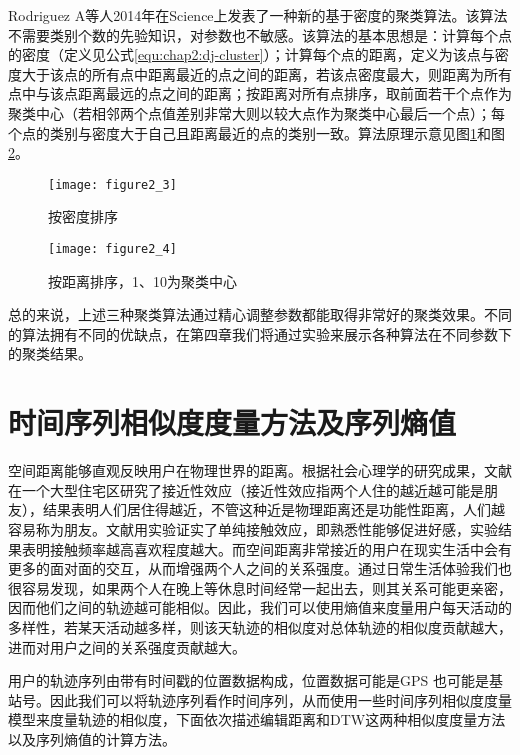 \par Rodriguez A等人2014年在Science上发表了一种新的基于密度的聚类算法。该算法不需要类别个数的先验知识，对参数也不敏感。该算法的基本思想是：计算每个点的密度（定义见公式\ref{equ:chap2:dj-cluster}）；计算每个点的距离，定义为该点与密度大于该点的所有点中距离最近的点之间的距离，若该点密度最大，则距离为所有点中与该点距离最远的点之间的距离；按距离对所有点排序，取前面若干个点作为聚类中心（若相邻两个点值差别非常大则以较大点作为聚类中心最后一个点）；每个点的类别与密度大于自己且距离最近的点的类别一致。算法原理示意见图\ref{fig:2_3}和图\ref{fig:2_4}。
\begin{figure}[htp]
\centering
\texttt{[image: figure2\_3]}
\caption{按密度排序}
\label{fig:2_3}
\end{figure}
\begin{figure}[htp]
\centering
\texttt{[image: figure2\_4]}
\caption{按距离排序，1、10为聚类中心}
\label{fig:2_4}
\end{figure}
\par 总的来说，上述三种聚类算法通过精心调整参数都能取得非常好的聚类效果。不同的算法拥有不同的优缺点，在第四章我们将通过实验来展示各种算法在不同参数下的聚类结果。
\section{时间序列相似度度量方法及序列熵值}
\label{sec:section2-2}
空间距离能够直观反映用户在物理世界的距离。根据社会心理学的研究成果，文献 在一个大型住宅区研究了接近性效应（接近性效应指两个人住的越近越可能是朋友），结果表明人们居住得越近，不管这种近是物理距离还是功能性距离，人们越容易称为朋友。文献用实验证实了单纯接触效应，即熟悉性能够促进好感，实验结果表明接触频率越高喜欢程度越大。而空间距离非常接近的用户在现实生活中会有更多的面对面的交互，从而增强两个人之间的关系强度。通过日常生活体验我们也很容易发现，如果两个人在晚上等休息时间经常一起出去，则其关系可能更亲密，因而他们之间的轨迹越可能相似。因此，我们可以使用熵值来度量用户每天活动的多样性，若某天活动越多样，则该天轨迹的相似度对总体轨迹的相似度贡献越大，进而对用户之间的关系强度贡献越大。
\par 用户的轨迹序列由带有时间戳的位置数据构成，位置数据可能是GPS 也可能是基站号。因此我们可以将轨迹序列看作时间序列，从而使用一些时间序列相似度度量模型来度量轨迹的相似度，下面依次描述编辑距离和DTW这两种相似度度量方法以及序列熵值的计算方法。
